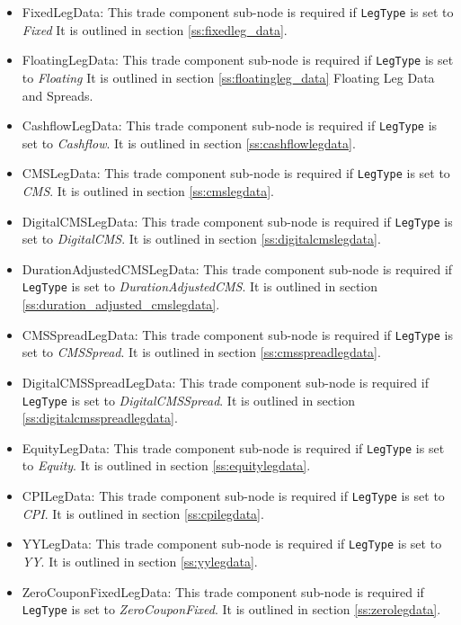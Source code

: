 \begin{itemize}
\item FixedLegData: This trade component sub-node is required if \lstinline!LegType! is set to \emph{Fixed} It is
outlined in section \ref{ss:fixedleg_data}.
\item FloatingLegData: This trade component sub-node is required if \lstinline!LegType! is set to \emph{Floating} It is
outlined in section \ref{ss:floatingleg_data} Floating Leg Data and Spreads.
\item CashflowLegData: This trade component sub-node is required if \lstinline!LegType! is set to \emph{Cashflow}. It is
  outlined in section \ref{ss:cashflowlegdata}.
\item CMSLegData: This trade component sub-node is required if \lstinline!LegType! is set to \emph{CMS}. It is
  outlined in section \ref{ss:cmslegdata}.
\item DigitalCMSLegData: This trade component sub-node is required if \lstinline!LegType! is set to \emph{DigitalCMS}. It is
  outlined in section \ref{ss:digitalcmslegdata}.
\item DurationAdjustedCMSLegData: This trade component sub-node is required if \lstinline!LegType! is set to \emph{DurationAdjustedCMS}. It is
  outlined in section \ref{ss:duration_adjusted_cmslegdata}.  
\item CMSSpreadLegData: This trade component sub-node is required if \lstinline!LegType! is set to \emph{CMSSpread}. It is
  outlined in section \ref{ss:cmsspreadlegdata}.
\item DigitalCMSSpreadLegData: This trade component sub-node is required if \lstinline!LegType! is set to \emph{DigitalCMSSpread}. It is
  outlined in section \ref{ss:digitalcmsspreadlegdata}.
\item EquityLegData: This trade component sub-node is required if \lstinline!LegType! is set to \emph{Equity}. It is
  outlined in section \ref{ss:equitylegdata}.    
\item CPILegData: This trade component sub-node is required if \lstinline!LegType! is set to \emph{CPI}. It is
  outlined in section \ref{ss:cpilegdata}.
\item YYLegData: This trade component sub-node is required if \lstinline!LegType! is set to \emph{YY}. It is
  outlined in section \ref{ss:yylegdata}.
\item ZeroCouponFixedLegData: This trade component sub-node is required if \lstinline!LegType! is set to \emph{ZeroCouponFixed}. It is
  outlined in section \ref{ss:zerolegdata}.
\end{itemize}

